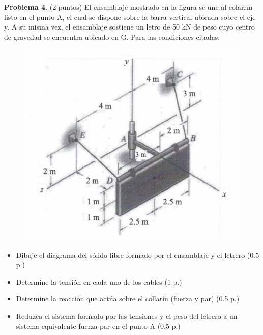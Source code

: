 \documentclass[10pt]{article}
\begin{document}
\textbf{Problema 4}. (2 puntos) El ensamblaje mostrado en la figura se une al colarrín listo en el punto A, el cual se dispone sobre la barra vertical ubicada sobre el eje y. A su misma vez, el ensamblaje sostiene un letro de 50 kN de peso cuyo centro de gravedad se encuentra ubicado en G. Para las condiciones citadas:
\begin{figure}[h!]
    \centering
    \includegraphics[width=0.45\linewidth]{problema_4.pdf}
    \label{fig:}
  \end{figure}
\begin{itemize}
    \item Dibuje el diagrama del sólido libre formado por el ensamblaje y el letrero (0.5 p.)
    \item Determine la tensión en cada uno de los cables (1 p.)
    \item Determine la reacción que actúa sobre el collarín (fuerza y par) (0.5 p.)
    \item Reduzca el sistema formado por las tensiones y el peso del letrero a un sistema equivalente fuerza-par en el punto A (0.5 p.)
\end{itemize}
\end{document}
